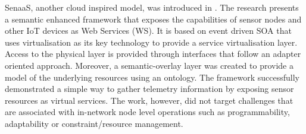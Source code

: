 SenaaS, another cloud inspired model, was introduced in \cite{alam2010virtualizing}. The research presents a semantic enhanced framework that exposes the capabilities of sensor nodes and other IoT devices as Web Services (WS). It is based on event driven SOA that uses virtualisation as its key technology to provide a service virtualisation layer. Access to the physical layer is provided through interfaces that follow an adapter oriented approach. Moreover, a semantic-overlay layer was created to provide a model of the underlying resources using an ontology.  The framework successfully demonstrated a simple way to gather telemetry information by exposing sensor resources as virtual services. The work, however, did not target challenges that are associated with in-network node level operations such as programmability, adaptability or constraint/resource management. 

